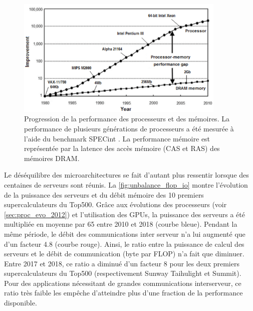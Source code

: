             \begin{figure}             \center             \includegraphics[width=10cm]{images/cpu_cpu_vs_memory.png}             \caption{\label{pic:cpuvsmemory} Progression de la performance des processeurs et des mémoires. La performance de plusieurs générations de processeurs a été mesurée à l'aide du benchmark SPECint \cite{Efnusheva2017ASO}. La performance mémoire est représentée par la latence des accès mémoire (CAS et RAS) des mémoires DRAM.}
            \end{figure}
            
            Le déséquilibre des microarchitectures se fait d'autant plus ressentir lorsque des centaines de serveurs sont réunis. La \autoref{fig:unbalance_flop_io} montre l'évolution de la puissance des serveurs et du débit mémoire des 10 premiers supercalculateurs du Top500. Grâce aux évolutions des processeurs (voir \autoref{sec:proc_evo_2012}) et l'utilisation des GPUs, la puissance des serveurs a été multipliée en moyenne par 65 entre 2010 et 2018 (courbe bleue). Pendant la même période, le débit des communications inter serveur n'a lui augmenté que d'un facteur 4.8 (courbe rouge). Ainsi, le ratio entre la puissance de calcul des serveurs et le débit de communication (byte par \gls{FLOP}) n'a fait que diminuer. Entre 2017 et 2018, ce ratio a diminué d'un facteur 8 pour les deux premiers supercalculateurs du Top500 (respectivement Sunway Taihulight et Summit). Pour des applications nécessitant de grandes communications interserveur, ce ratio très faible les empêche d'atteindre plus d’une fraction de la performance disponible.
            
